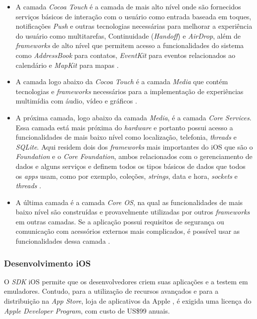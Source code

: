 \begin{itemize}
	\item A camada \textit{Cocoa Touch} é a camada de mais alto nível onde são fornecidos serviços básicos de interação 
    com o usuário como entrada baseada em toques, notificações \textit{Push} e outras tecnologias necessárias para
     melhorar a experiência do usuário como multitarefas, Continuidade (\textit{Handoff}) e \textit{AirDrop}, além de \textit{frameworks} 
     de alto nível que permitem acesso a funcionalidades do sistema como \textit{AddressBook} para contatos, \textit{EventKit} 
     para eventos relacionados ao calendário e \textit{MapKit} para mapas \cite{apple_inc_tech_2014}.
	\item A camada logo abaixo da \textit{Cocoa Touch} é a camada \textit{Media} que contém tecnologias e \textit{frameworks} necessários 
    para a implementação de experiências multimídia com áudio, vídeo e gráficos \cite{apple_inc_tech_2014}.
	\item A próxima camada, logo abaixo da camada \textit{Media}, é a camada \textit{Core Services}. Essa camada está mais próxima 
    do \textit{hardware} e portanto possui acesso a funcionalidades de mais baixo nível como localização, telefonia, \textit{threads} 
    e \textit{SQLite}. Aqui residem dois dos \textit{frameworks} mais importantes do iOS que são o \textit{Foundation} e o \textit{Core Foundation}, 
    ambos relacionados com o gerenciamento de dados e alguns serviços e definem todos os tipos básicos de dados que 
    todos os \textit{apps} usam, como por exemplo, coleções, \textit{strings}, data e hora, \textit{sockets} e \textit{threads} \cite{apple_inc_tech_2014}.
	\item A última camada é a camada \textit{Core OS}, na qual as funcionalidades de mais baixo nível são construídas e 
    provavelmente utilizadas por outros \textit{frameworks} em outras camadas. Se a aplicação possui requisitos de segurança 
    ou comunicação com acessórios externos mais complicados, é possível usar as funcionalidades dessa camada \cite{apple_inc_tech_2014}.
\end{itemize}

\subsubsection{Desenvolvimento iOS} \label{subsubsection-dev-ios}

O \textit{SDK} iOS permite que os desenvolvedores criem suas aplicações e a testem em emuladores. 
Contudo, para a utilização de recursos avançados e para a distribuição 
na \textit{App Store}, loja de aplicativos da Apple \cite{apple_inc_program_2016}, é exigida uma licença do \textit{Apple Developer Program}, com custo de US\$99 anuais.   

